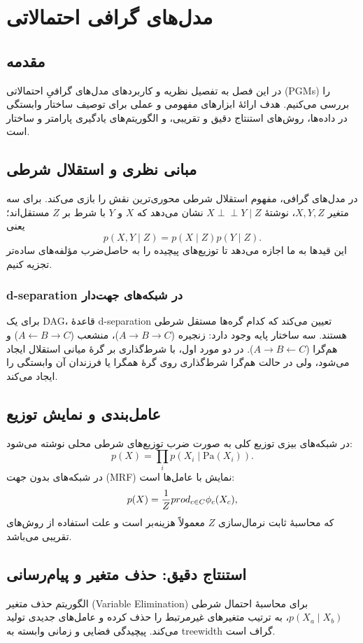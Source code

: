 \def \Subject {مدل‌های گرافی احتمالاتی}
\def \Session {یک}
\renewcommand{\chaptername}{بخش}
\chapter{\Subject}

\section{مقدمه}
در این فصل به تفصیل نظریه و کاربردهای مدل‌های گرافیِ احتمالاتی (PGMs) را بررسی می‌کنیم. هدف ارائهٔ ابزارهای مفهومی و عملی برای توصیف ساختار وابستگی در داده‌ها، روش‌های استنتاج دقیق و تقریبی، و الگوریتم‌های یادگیری پارامتر و ساختار است.

\section{مبانی نظری و استقلال شرطی}
در مدل‌های گرافی، مفهوم استقلال شرطی محوری‌ترین نقش را بازی می‌کند. برای سه متغیر $X,Y,Z$، نوشتهٔ $X \perp\!\!\perp Y\mid Z$ نشان می‌دهد که $X$ و $Y$ با شرط بر $Z$ مستقل‌اند؛ یعنی
$$
p(X,Y\mid Z)=p(X\mid Z)p(Y\mid Z).
$$
این قیدها به ما اجازه می‌دهد تا توزیع‌های پیچیده را به حاصل‌ضرب مؤلفه‌های ساده‌تر تجزیه کنیم.

\subsection{d-separation در شبکه‌های جهت‌دار}
برای یک DAG، قاعدهٔ d-separation تعیین می‌کند که کدام گره‌ها مستقل شرطی هستند. سه ساختار پایه وجود دارد: زنجیره ($A\to B\to C$)، منشعب ($A\leftarrow B\to C$) و هم‌گرا ($A\to B\leftarrow C$). در دو مورد اول، با شرط‌گذاری بر گرهٔ میانی استقلال ایجاد می‌شود، ولی در حالت هم‌گرا شرط‌گذاری روی گرهٔ همگرا یا فرزندان آن وابستگی را ایجاد می‌کند.

\section{عامل‌بندی و نمایش توزیع}
در شبکه‌های بیزی توزیع کلی به صورت ضرب توزیع‌های شرطی محلی نوشته می‌شود:
$$
p(X)=\prod_{i} p(X_i\mid \mathrm{Pa}(X_i)).
$$
در شبکه‌های بدون جهت (MRF) نمایش با عامل‌ها است:
$$
p(X)=\frac{1}{Z}\\prod_{c\in C} \phi_c(X_c),
$$
که محاسبهٔ ثابت نرمال‌سازی $Z$ معمولاً هزینه‌بر است و علت استفاده از روش‌های تقریبی می‌باشد.

\section{استنتاج دقیق: حذف متغیر و پیام‌رسانی}
الگوریتم حذف متغیر (Variable Elimination) برای محاسبهٔ احتمال شرطی $p(X_a\mid X_b)$، به ترتیب متغیرهای غیرمرتبط را حذف کرده و عامل‌های جدیدی تولید می‌کند. پیچیدگی فضایی و زمانی وابسته به treewidth گراف است.

